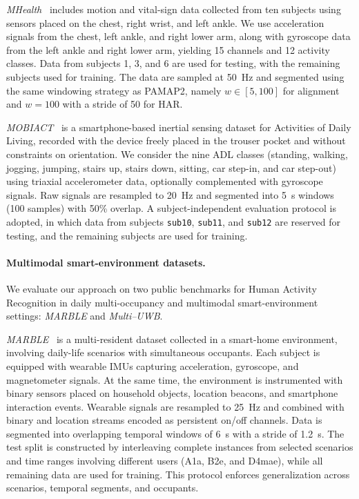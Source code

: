 \documentclass[preprint,12pt]{elsarticle}
\begin{document}
\emph{MHealth}~\cite{banos2014mhealthdroid} includes motion and vital-sign data collected from ten subjects using sensors placed on the chest, right wrist, and left ankle. We use acceleration signals from the chest, left ankle, and right lower arm, along with gyroscope data from the left ankle and right lower arm, yielding 15 channels and 12 activity classes. Data from subjects 1, 3, and 6 are used for testing, with the remaining subjects used for training. The data are sampled at 50~Hz and segmented using the same windowing strategy as PAMAP2, namely $w \in [5,100]$ for alignment and $w=100$ with a stride of 50 for HAR.

\emph{MOBIACT}~\cite{chatzaki2016human} is a smartphone-based inertial sensing dataset for Activities of Daily Living, recorded with the device freely placed in the trouser pocket and without constraints on orientation. We consider the nine ADL classes (standing, walking, jogging, jumping, stairs up, stairs down, sitting, car step-in, and car step-out) using triaxial accelerometer data, optionally complemented with gyroscope signals. Raw signals are resampled to 20~Hz and segmented into 5~s windows (100 samples) with 50\% overlap. A subject-independent evaluation protocol is adopted, in which data from subjects \texttt{sub10}, \texttt{sub11}, and \texttt{sub12} are reserved for testing, and the remaining subjects are used for training.

\paragraph{Multimodal smart-environment datasets.}

We evaluate our approach on two public benchmarks for Human Activity Recognition in daily multi-occupancy and multimodal smart-environment settings: \emph{MARBLE} and \emph{Multi--UWB}.  

\emph{MARBLE}~\cite{arrotta2021marble} is a multi-resident dataset collected in a smart-home environment, involving daily-life scenarios with simultaneous occupants. Each subject is equipped with wearable IMUs capturing acceleration, gyroscope, and magnetometer signals. At the same time, the environment is instrumented with binary sensors placed on household objects, location beacons, and smartphone interaction events. Wearable signals are resampled to 25~Hz and combined with binary and location streams encoded as persistent on/off channels. Data is segmented into overlapping temporal windows of 6~s with a stride of 1.2~s. The test split is constructed by interleaving complete instances from selected scenarios and time ranges involving different users (A1a, B2e, and D4mae), while all remaining data are used for training. This protocol enforces generalization across scenarios, temporal segments, and occupants.
\end{document}
